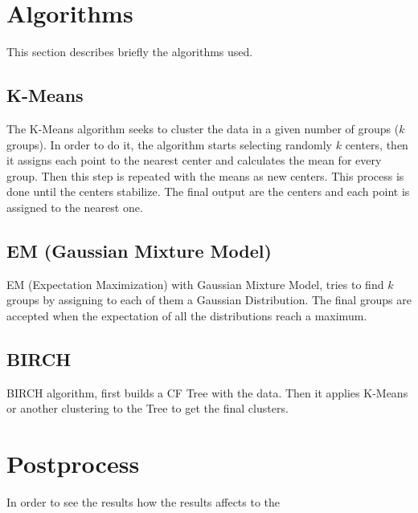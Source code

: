 \documentclass[sigconf,authorversion]{acmart}
\begin{document}
\section{Algorithms}
This section describes briefly the algorithms used.
\subsection{K-Means}
The K-Means algorithm seeks to cluster the data in a given number of groups ($k$ groups). In order to do it, the algorithm starts selecting randomly $k$ centers, then it assigns each point to the nearest center and calculates the mean for every group. Then this step is repeated with the means as new centers. This process is done until the centers stabilize. The final output are the centers and each point is assigned to the nearest one.
\subsection{EM (Gaussian Mixture Model)}
EM (Expectation Maximization) with Gaussian Mixture Model, tries to find $k$ groups by assigning to each of them a Gaussian Distribution. The final groups are accepted when the expectation of all the distributions reach a maximum.
\subsection{BIRCH}
BIRCH algorithm, first builds a CF Tree with the data. Then it applies K-Means or another clustering to the Tree to get the final clusters.

\section{Postprocess}
In order to see the results how the results affects to the 
\end{document}
